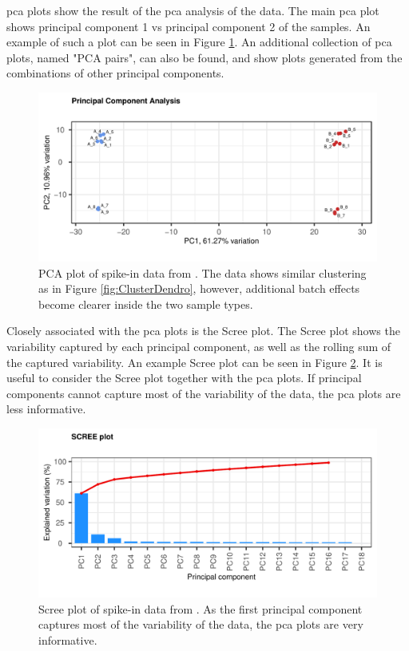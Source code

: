 \gls{pca} plots show the result of the \gls{pca} analysis of the data. The main \gls{pca} plot shows principal component 1 vs principal component 2 of the samples. An example of such a plot can be seen in Figure \ref{fig:PCAplot}. An additional collection of \gls{pca} plots, named "PCA pairs", can also be found, and show plots generated from the combinations of other principal components.

\begin{figure}
    \centering
    \includegraphics{resources/images/6_PCA - original.pdf}
    \caption{PCA plot of spike-in data from \textcite{zhuPreferredAnalysisMethods2010}. The data shows similar clustering as in Figure \ref{fig:ClusterDendro}, however, additional batch effects become clearer inside the two sample types.}
    \label{fig:PCAplot}
\end{figure}

Closely associated with the \gls{pca} plots is the Scree plot. The Scree plot shows the variability captured by each principal component, as well as the rolling sum of the captured variability. An example Scree plot can be seen in Figure \ref{fig:Scree}. It is useful to consider the Scree plot together with the \gls{pca} plots. If principal components cannot capture most of the variability of the data, the \gls{pca} plots are less informative.

\begin{figure}
    \centering
    \includegraphics{resources/images/5_Scree Plot - original.pdf}
    \caption{Scree plot of spike-in data from \textcite{zhuPreferredAnalysisMethods2010}. As the first principal component captures most of the variability of the data, the \gls{pca} plots are very informative.}
    \label{fig:Scree}
\end{figure}

